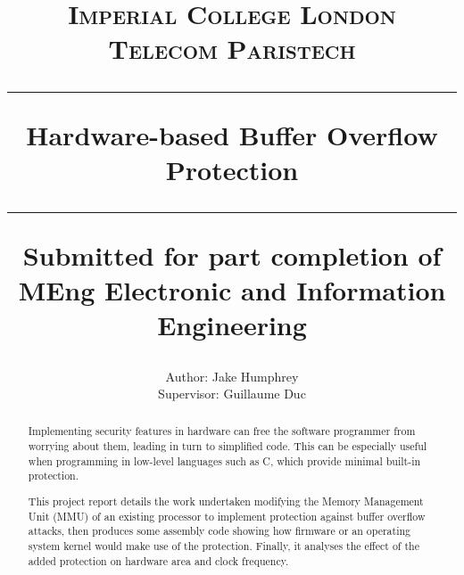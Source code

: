 \documentclass[11pt,a4paper,twoside,openany]{report}
\title{%
{\normalsize\scshape Imperial College London}\\
{\normalsize\scshape Telecom Paristech}\\
\vspace{2em}
\hrule
\vspace{1em}
{\huge\bfseries Hardware-based Buffer Overflow Protection}\\
\vspace{1em}
\hrule
\vspace{1em}
{\small Submitted for part completion of MEng Electronic and Information Engineering}
}
\author{%
Author: Jake Humphrey\\
Supervisor: Guillaume Duc
}
\date{}
\begin{document}

\pagestyle{empty}

\maketitle

\cleardoublepage
\begin{abstract}
Implementing security features in hardware can free the software programmer from worrying about them, leading in turn to simplified code. This can be especially useful when programming in low-level languages such as C, which provide minimal built-in protection.

This project report details the work undertaken modifying the Memory Management Unit (MMU) of an existing processor to implement protection against buffer overflow attacks, then produces some assembly code showing how firmware or an operating system kernel would make use of the protection. Finally, it analyses the effect of the added protection on hardware area and clock frequency.

\end{abstract}

\cleardoublepage
\pagestyle{plain}
\setcounter{page}{1}
\tableofcontents

\newpage
\cleardoublepage
{}





\end{document}
